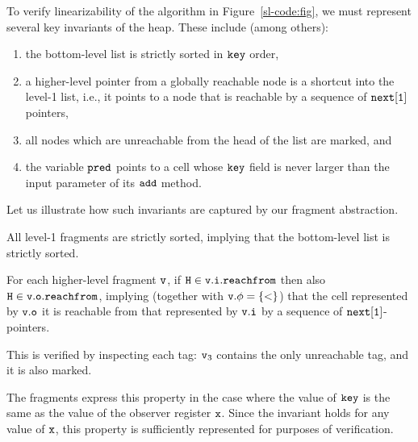 To verify linearizability of the algorithm in Figure~\ref{sl-code:fig},
we must represent several key invariants of the heap. These include (among others):
\begin{enumerate}
\item the bottom-level list is strictly sorted in $\tt key$ order,
\item a higher-level pointer from a globally reachable node is a shortcut into the level-1 list, i.e.,
  it points to a node that is reachable by a sequence of $\tt next[1]$ pointers,
\item all nodes which are unreachable from the head of the list are marked,
  and
\item the variable $\tt pred$ points to a cell whose $\tt key$ field is never
  larger than the input parameter of its $\tt add$ method.
\end{enumerate}
Let us illustrate how such invariants are captured by our fragment abstraction.
\begin{inparaenum}[1)]
\item
  All level-1 fragments are strictly sorted, implying that the bottom-level list is strictly sorted.
\item
  For each higher-level fragment $\tt v$, if $\tt H \in \tt v.i.\mathtt{reachfrom}$ then also $\tt H \in \tt v.o.\mathtt{reachfrom}$,
  implying (together with $\tt v.\phi = \left\{<\right\}$)
  that the cell represented by $\tt v.o$ it is reachable from that represented by $\tt v.i$
  by a sequence of $\tt next[1]$-pointers.
\item
  This is verified by inspecting each tag: $\mathtt{v}_{3}$ contains the only unreachable tag, and it is also marked.
\item
  The fragments express this property in the case where the value of $\tt key$ is
  the same as the value of the observer register $\tt x$. 
 Since the invariant holds for any value of $\tt x$, this property
  is sufficiently represented for purposes of verification.
\end{inparaenum}

